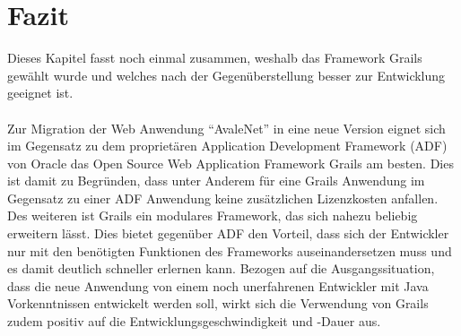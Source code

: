 \section{Fazit}
Dieses Kapitel fasst noch einmal zusammen, weshalb das Framework Grails gewählt wurde und welches nach der Gegenüberstellung besser zur Entwicklung geeignet ist.\\\\
Zur Migration der Web Anwendung "`AvaleNet"' in eine neue Version eignet sich im Gegensatz zu dem proprietären Application Development Framework (ADF) von Oracle das Open Source Web Application Framework Grails am besten. Dies ist damit zu Begründen, dass unter Anderem für eine Grails Anwendung im Gegensatz zu einer ADF Anwendung keine zusätzlichen Lizenzkosten anfallen. Des weiteren ist Grails ein modulares Framework, das sich nahezu beliebig erweitern lässt. Dies bietet gegenüber ADF den Vorteil, dass sich der Entwickler nur mit den benötigten Funktionen des Frameworks auseinandersetzen muss und es damit deutlich schneller erlernen kann.
Bezogen auf die Ausgangssituation, dass die neue Anwendung von einem noch unerfahrenen Entwickler mit Java Vorkenntnissen entwickelt werden soll, wirkt sich die Verwendung von Grails zudem positiv auf die Entwicklungsgeschwindigkeit und -Dauer aus.